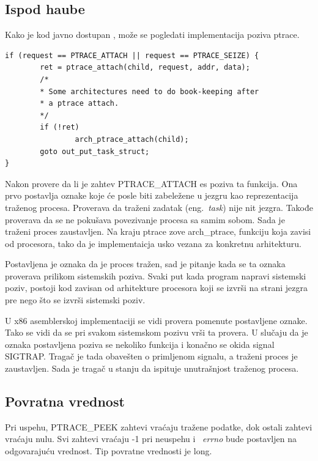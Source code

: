 \documentclass[a4paper]{article}
\begin{document}
\subsection{Ispod haube}	

Kako je kod javno dostupan \cite{code}, može se pogledati implementacija poziva ptrace.
\begin{verbatim}
if (request == PTRACE_ATTACH || request == PTRACE_SEIZE) {
        ret = ptrace_attach(child, request, addr, data);
        /*
        * Some architectures need to do book-keeping after
        * a ptrace attach.
        */
        if (!ret)
                arch_ptrace_attach(child);
        goto out_put_task_struct;
}
\end{verbatim}

Nakon provere da li je zahtev PTRACE\_ATTACH es poziva ta funkcija.
Ona prvo postavlja oznake koje će posle biti zabeležene u jezgru kao reprezentacija 
traženog procesa. Proverava da traženi zadatak (eng.~{\em task}) nije nit jezgra. 
Takođe proverava da se ne pokušava povezivanje procesa sa samim sobom.
Sada je traženi proces zaustavljen. Na kraju ptrace zove arch\_ptrace, funkciju koja zavisi
od procesora, tako da je implementaicja usko vezana za konkretnu arhitekturu.

Postavljena je oznaka da je proces tražen, sad je pitanje kada se ta oznaka proverava prilikom 
sistemskih poziva. Svaki put kada program napravi sistemski poziv, postoji kod zavisan od arhitekture
procesora koji se izvrši na strani jezgra pre nego što se izvrši sistemski poziv.

U x86 asemblerskoj implementaciji se vidi provera pomenute postavljene oznake\cite{blog}.
Tako se vidi da se pri svakom sistemskom pozivu vrši ta provera. 
U slučaju da je oznaka postavljena poziva se nekoliko funkcija i konačno se okida signal SIGTRAP.
Tragač je tada obavešten o primljenom signalu, a traženi proces je zaustavljen. 
Sada je tragač u stanju da ispituje unutrašnjost traženog procesa.


\subsection{Povratna vrednost}	
\label{sec:return}

Pri uspehu, PTRACE\_PEEK zahtevi vraćaju tražene podatke, dok ostali zahtevi vraćaju nulu. 
Svi zahtevi vraćaju -1 pri neuspehu i ~\emph{errno} bude postavljen na odgovarajuću vrednost.
Tip povratne vrednosti je long.
\end{document}
